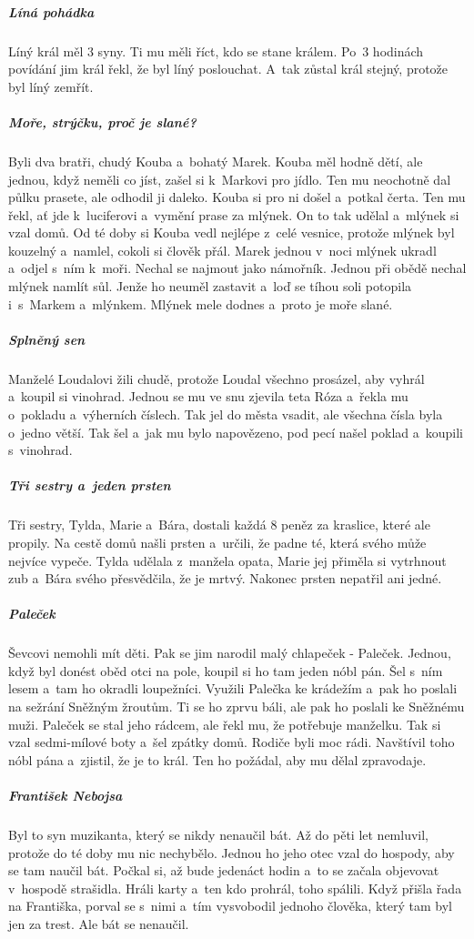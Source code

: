 {{\subparagraph{Líná pohádka}
	Líný král měl 3 syny. Ti mu měli říct, kdo se stane králem. Po~3 hodinách
	povídání jim král řekl, že byl líný poslouchat. A~tak zůstal král stejný,
	protože byl líný zemřít.

\subparagraph{Moře, strýčku, proč je slané?}
	Byli dva bratři, chudý Kouba a~bohatý Marek. Kouba měl hodně dětí, ale jednou,
	když neměli co jíst, zašel si k~Markovi pro jídlo. Ten mu neochotně dal půlku
	prasete, ale odhodil ji daleko. Kouba si pro ni došel a~potkal čerta. Ten mu
	řekl, ať jde k~luciferovi a~vymění prase za mlýnek. On to tak udělal a~mlýnek
	si vzal domů. Od té doby si Kouba vedl nejlépe z~celé vesnice, protože mlýnek
	byl kouzelný a~namlel, cokoli si člověk přál. Marek jednou v~noci mlýnek ukradl
	a~odjel s~ním k~moři. Nechal se najmout jako námořník. Jednou při obědě nechal
	mlýnek namlít sůl. Jenže ho neuměl zastavit a~loď se tíhou soli potopila
	i~s~Markem a~mlýnkem. Mlýnek mele dodnes a~proto je moře slané.

\subparagraph{Splněný sen}
	Manželé Loudalovi žili chudě, protože Loudal všechno prosázel, aby vyhrál
	a~koupil si vinohrad. Jednou se mu ve snu zjevila teta Róza a~řekla mu
	o~pokladu a~výherních číslech. Tak jel do města vsadit, ale všechna čísla
	byla o~jedno větší. Tak šel a~jak mu bylo napovězeno, pod pecí našel poklad
	a~koupili s~vinohrad.

\subparagraph{Tři sestry a~jeden prsten}
	Tři sestry, Tylda, Marie a~Bára, dostali každá 8 peněz za kraslice, které ale
	propily. Na cestě domů našli prsten a~určili, že padne té, která svého může
	nejvíce vypeče. Tylda udělala z~manžela opata, Marie jej přiměla si vytrhnout
	zub a~Bára svého přesvědčila, že je mrtvý. Nakonec prsten nepatřil ani jedné.

\subparagraph{Paleček}
	Ševcovi nemohli mít děti. Pak se jim narodil malý chlapeček - Paleček.
	Jednou, když byl donést oběd otci na pole, koupil si ho tam jeden nóbl pán.
	Šel s~ním lesem a~tam ho okradli loupežníci. Využili Palečka ke krádežím
	a~pak ho poslali na sežrání Sněžným žroutům. Ti se ho zprvu báli, ale pak
	ho poslali ke Sněžnému muži. Paleček se stal jeho rádcem, ale řekl mu, že
	potřebuje manželku. Tak si vzal sedmi-mílové boty a~šel zpátky domů. Rodiče
	byli moc rádi. Navštívil toho nóbl pána a~zjistil, že je to král. Ten ho
	požádal, aby mu dělal zpravodaje.

\subparagraph{František Nebojsa}
	Byl to syn muzikanta, který se nikdy nenaučil bát. Až do pěti let nemluvil,
	protože do té doby mu nic nechybělo. Jednou ho jeho otec vzal do hospody,
	aby se tam naučil bát. Počkal si, až bude jedenáct hodin a~to se začala
	objevovat v~hospodě strašidla. Hráli karty a~ten kdo prohrál, toho spálili.
	Když přišla řada na Františka, porval se s~nimi a~tím vysvobodil jednoho
	člověka, který tam byl jen za trest. Ale bát se nenaučil.

}}

